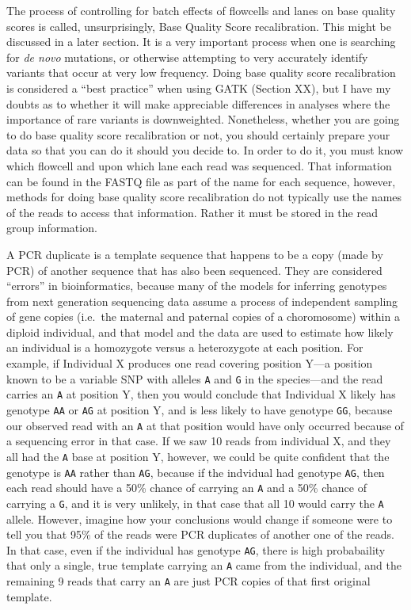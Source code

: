 \documentclass[]{krantz}
\begin{document}
The process of controlling for batch effects of flowcells and lanes on base quality scores
is called, unsurprisingly, Base Quality Score recalibration. This might be discussed
in a later section. It is a very important process when one is searching for \emph{de novo}
mutations, or otherwise attempting to very accurately identify variants that occur
at very low frequency. Doing base quality score recalibration is considered a ``best practice''
when using GATK (Section XX), but I have my doubts as to whether it will make appreciable differences
in analyses where the importance of rare variants is downweighted. Nonetheless, whether
you are going to do base quality score recalibration or not, you should certainly prepare
your data so that you can do it should you decide to. In order to do it, you must know
which flowcell and upon which lane each read was sequenced. That information can be found in the
FASTQ file as part of the name for each sequence, however, methods for doing base quality score
recalibration do not typically use the names of the reads to access that information. Rather it
must be stored in the read group information.

A PCR duplicate is a template sequence that happens to be a copy (made by PCR)
of another sequence that has also been sequenced. They are considered ``errors''
in bioinformatics, because many of the models for inferring genotypes from
next generation sequencing data assume a process of independent sampling of gene
copies (i.e.~the maternal and paternal copies of a choromosome) within a diploid
individual, and that model and the data are used to estimate how likely an individual
is a homozygote versus a heterozygote at each position. For example, if Individual X
produces one read covering position Y---a position known to be a variable SNP
with alleles \texttt{A} and \texttt{G} in the species---and the read carries an \texttt{A} at position Y,
then you would conclude that Individual X likely has genotype \texttt{AA} or \texttt{AG} at position
Y, and is less likely to have genotype \texttt{GG}, because our observed read with an \texttt{A} at that
position would have only occurred because of a sequencing error in that case.
If we saw 10 reads from individual X, and they all had the \texttt{A} base at position Y, however,
we could be quite confident that the genotype is \texttt{AA} rather than \texttt{AG}, because if the indvidual
had genotype \texttt{AG}, then each read should have a 50\% chance of carrying an \texttt{A}
and a 50\% chance of carrying a \texttt{G}, and it is very unlikely, in that case that
all 10 would carry the \texttt{A} allele. However, imagine how your conclusions would
change if someone were to tell you that 95\% of the reads were PCR duplicates of another one of
the reads. In that case, even if the individual has genotype \texttt{AG}, there is high probabaility
that only a single, true template carrying an \texttt{A} came from the individual, and the remaining
9 reads that carry an \texttt{A} are just PCR copies of that first original template.
\end{document}
